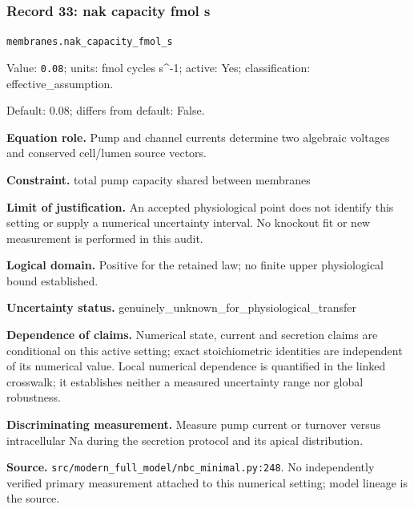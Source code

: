 \subsubsection*{Record 33: nak capacity fmol s}
{\small \nolinkurl{membranes.nak_capacity_fmol_s}\par

Value: \texttt{0.08}; units: fmol cycles s\textasciicircum{}-1; active: Yes; classification: effective\_assumption.\par

Default: 0.08; differs from default: False.\par

\textbf{Equation role.} Pump and channel currents determine two algebraic voltages and conserved cell/lumen source vectors.\par

\textbf{Constraint.} total pump capacity shared between membranes\par

\textbf{Limit of justification.} An accepted physiological point does not identify this setting or supply a numerical uncertainty interval. No knockout fit or new measurement is performed in this audit.\par

\textbf{Logical domain.} Positive for the retained law; no finite upper physiological bound established.\par

\textbf{Uncertainty status.} genuinely\_unknown\_for\_physiological\_transfer\par

\textbf{Dependence of claims.} Numerical state, current and secretion claims are conditional on this active setting; exact stoichiometric identities are independent of its numerical value. Local numerical dependence is quantified in the linked crosswalk; it establishes neither a measured uncertainty range nor global robustness.\par

\textbf{Discriminating measurement.} Measure pump current or turnover versus intracellular Na during the secretion protocol and its apical distribution.\par

\textbf{Source.} \nolinkurl{src/modern_full_model/nbc_minimal.py:248}. No independently verified primary measurement attached to this numerical setting; model lineage is the source.\par}

